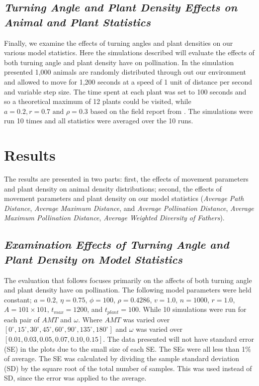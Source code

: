 \documentclass[preprint,12pt]{elsarticle}
\numberwithin{equation}{subsection}
\begin{document}
\subsection{\emph{Turning Angle and Plant Density Effects on Animal and Plant
Statistics}}\label{EffectOnStats}
Finally, we examine the effects of turning angles and plant densities on our
various model statistics. %
Here the simulations described will evaluate the effects of both turning angle and plant density have on pollination. In the
simulation presented 1,000 animals are randomly distributed through out our
environment and allowed to move for 1,200 seconds at a speed of 1 unit of
distance per second and variable step size. The time spent at each plant was set
to 100 seconds and so a theoretical maximum of 12 plants could be visited,%
while $a = 0.2, r = 0.7 \mbox{ and } \rho =
0.3$ based on the field report from \cite{Gathman} \cite{Raine}. The simulations
were run 10 times and all statistics were averaged over the 10 runs.

\section{{\bf Results}}
The results are presented in two parts: first, the effects of movement
parameters and plant density on animal density distributions; second, the
effects of movement parameters and plant density on our model statistics
(\emph{Average Path Distance}, \emph{Average Maximum Distance}, and
\emph{Average Pollination Distance}, \emph{Average Maximum Pollination
Distance}, \emph{Average Weighted Diversity of Fathers}).

\subsection{\emph{Examination Effects of Turning Angle and Plant Density on
Model Statistics}}
The evaluation that follows focuses primarily on the affects of both turning
angle and plant density have on pollination. The following model parameters were
held constant; $a = 0.2$, $\eta = 0.75 $, $\phi = 100$, $\rho = 0.4286$, $v =
1.0$, $n = 1000$, $r = 1.0$, $A = 101 \times 101$, $t_{max} = 1200$, and
$t_{plant} = 100$. While 10 simulations were run for each pair of $AMT$ and
$\omega$. Where $AMT$ was varied over $[0^\circ, 15^\circ, 30^\circ, 45^\circ,
60^\circ, 90^\circ, 135^\circ, 180^\circ]$ and $\omega$ was varied over $[0.01,
0.03, 0.05, 0.07, 0.10, 0.15]$. The data presented will not have standard error
(SE) in the plots due to the small size of each SE. The SEs were all less than
1\% of average. The SE was calculated by dividing the sample standard deviation
(SD) by the square root of the total number of samples. This was used instead of
SD, since the error was applied to the average.
\end{document}
